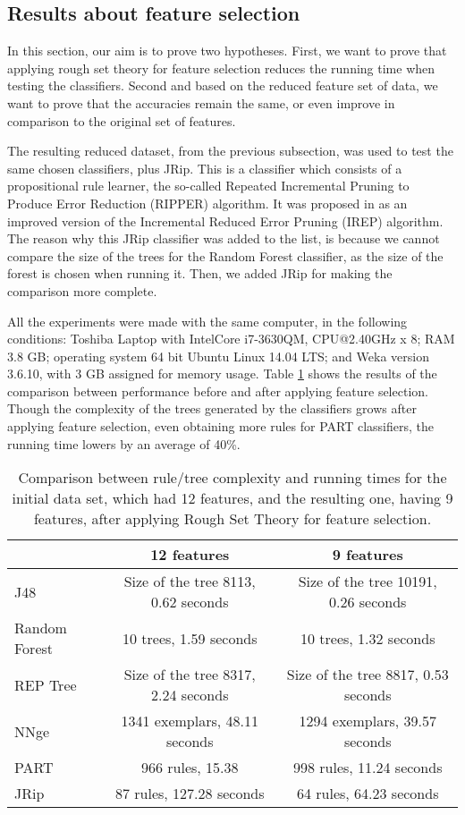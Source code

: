 \documentclass{llncs}
\begin{document}
\subsection{Results about feature selection}
\label{subsec:RSTresults}

In this section, our aim is to prove two hypotheses. First, we want to
prove that applying rough set theory for feature selection reduces the
running time when testing the classifiers. Second and based on the
reduced feature set of data, we want to prove that the accuracies
remain the same, or even improve in comparison to the original set of
features.

The resulting reduced dataset, from the previous subsection, was used to test the same chosen classifiers, plus JRip. This is a classifier which consists of a propositional rule learner, the so-called Repeated Incremental Pruning to Produce Error Reduction (RIPPER) algorithm. It was proposed in \cite{cohen1995fast} as an improved version of the Incremental Reduced Error Pruning (IREP) algorithm. The reason why this JRip classifier was added to the list, is because we cannot compare the size of the trees for the Random Forest classifier, as the size of the forest is chosen when running it. Then, we added JRip for making the comparison more complete.

All the experiments were made with the same computer, in the following
conditions: Toshiba Laptop with Intel\texttrademark  Core i7-3630QM,
CPU@2.40GHz x 8; RAM 3.8 GB; operating system 64 bit Ubuntu Linux 14.04 LTS; and Weka version 3.6.10, with 3 GB assigned for memory
usage. Table \ref{tab_runningtimes} shows the results of the
comparison between performance before and after applying feature
selection. Though the complexity of the trees generated by the
classifiers grows after applying feature selection, even obtaining
more rules for PART classifiers, the running time lowers by an average
of 40\%.


\begin{table}[htpb]
\centering
 \caption{\label{tab_runningtimes} Comparison between rule/tree complexity and running times for the initial data set, which had 12 features, and the resulting one, having 9 features, after applying Rough Set Theory for feature selection.}
{\small
\begin{tabular}{|l|c|c|}
\cline{2-3}
\multicolumn{1}{l|}{} & 12 features & 9 features \\
\hline
J48 & Size of the tree 8113, 0.62 seconds & Size of the tree 10191, 0.26 seconds \\
\cline{1-1}
Random Forest & 10 trees, 1.59 seconds & 10 trees, 1.32 seconds \\
\cline{1-1}
REP Tree & Size of the tree 8317, 2.24 seconds & Size of the tree 8817, 0.53 seconds \\
\cline{1-1}
NNge & 1341 exemplars, 48.11 seconds & 1294 exemplars, 39.57 seconds \\
\cline{1-1}
PART & 966 rules, 15.38 & 998 rules, 11.24 seconds \\
\cline{1-1}
JRip & 87 rules, 127.28 seconds & 64 rules, 64.23 seconds \\
\hline
\end{tabular}
}
\end{table}
\end{document}
